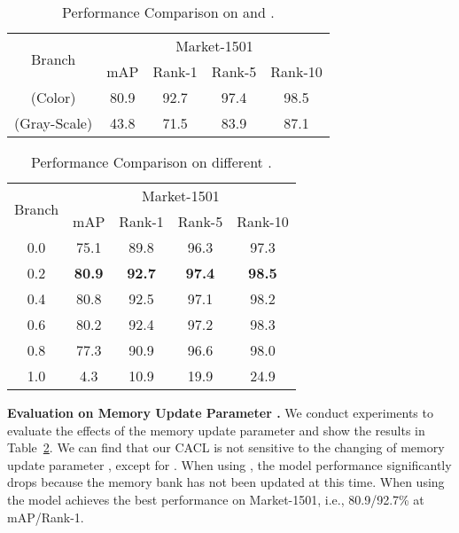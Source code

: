 \documentclass[journal]{IEEEtran}
\def\ie{i.e.}
\newcommand{\myparagraph}[1]{\noindent\textbf{#1.}}
\begin{document}
\begin{table}
\small
\caption{Performance Comparison on  and .}
\begin{center}
\begin{tabular}{|c|c|c|c|c|}
					\hline		
					\multirow{2}{*}{Branch} & \multicolumn{4}{c|}{Market-1501}\\
					\cline{2-5}  
					& mAP & Rank-1 &Rank-5&Rank-10\\
					
\hline\hline


 (Color)  &80.9&92.7&97.4&98.5\\
 (Gray-Scale)  &43.8 &71.5 &83.9 &87.1\\
\hline

\end{tabular}
\end{center}

\label{Tab:gray-intrain}
\end{table}



\begin{table}
\small
\caption{Performance Comparison on different .}
\begin{center}
\begin{tabular}{|c|c|c|c|c|}
					\hline		
					\multirow{2}{*}{Branch} & \multicolumn{4}{c|}{Market-1501}\\
					\cline{2-5}  
					& mAP & Rank-1 &Rank-5&Rank-10\\
					
\hline\hline

0.0  &75.1&89.8&96.3&97.3\\
0.2   &{\bf80.9}&{\bf92.7}&{\bf97.4}&{\bf98.5}\\
0.4  &80.8 &92.5 &97.1 &98.2\\
0.6  &80.2 &92.4 &97.2 &98.3\\
0.8  &77.3 &90.9 &96.6 &98.0\\
1.0  &4.3 &10.9 &19.9 &24.9\\
\hline

\end{tabular}
\end{center}

\label{Tab:momentum}
\end{table}


\myparagraph{Evaluation on Memory Update Parameter }  We conduct experiments to evaluate the effects of the memory update parameter  and show the results in Table~\ref{Tab:momentum}. We can find that our CACL is not sensitive to the changing of memory update parameter , except for . When using , the model performance significantly drops because the memory bank has not been updated at this time. When using  the model achieves the best performance on Market-1501, \ie,  80.9/92.7\% at mAP/Rank-1.
\end{document}
